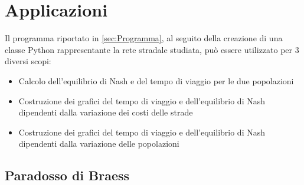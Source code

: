 \section{Applicazioni}
\label{sec:Applicazioni}

Il programma riportato in \autoref{sec:Programma}, al seguito della creazione di una classe Python \cite{python_docs} rappresentante
la rete stradale studiata, può essere utilizzato per 3 diversi scopi:
\begin{itemize}
    \item Calcolo dell'equilibrio di Nash e del tempo di viaggio per le due popolazioni
    \item Costruzione dei grafici del tempo di viaggio e dell'equilibrio di Nash dipendenti dalla variazione dei costi delle strade
    \item Costruzione dei grafici del tempo di viaggio e dell'equilibrio di Nash dipendenti dalla variazione delle popolazioni
\end{itemize}

\subsection{Paradosso di Braess}
\label{subsec:Es1}

